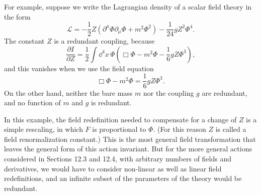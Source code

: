 For example, suppose we write the Lagrangian density of a scalar field theory
in the form
\[
\mathcal L=-\frac12Z(\partial^\mu\Phi\partial_\mu\Phi+m^2\Phi^2)
-\frac1{24}gZ^2\Phi^4.
\]
The constant $Z$ is a redundant coupling, because
\[
\frac{\partial I}{\partial Z}=\frac12\int \dd^4x\,
\Phi\left(\Box\Phi-m^2\Phi-\frac16gZ\Phi^3\right),
\]
and this vanishes when we use the field equation
\[
\Box\Phi-m^2\Phi=\frac16gZ\Phi^3.
\]
On the other hand, neither the bare mass $m$ nor the coupling $g$ are
redundant, and no function of $m$ and $g$ is redundant.

In this example, the field redefinition needed to compensate for a change of
$Z$ is a simple rescaling, in which $F$ is proportional to $\Phi$. (For this
reason $Z$ is called a field renormalization constant.) This is the most
general field transformation that leaves the general form of this action
invariant. But for the more general actions considered in Sections 12.3 and
12.4, with arbitrary numbers of fields and derivatives, we would have to
consider non-linear as well as linear field redefinitions, and an infinite
subset of the parameters of the theory would be redundant.
